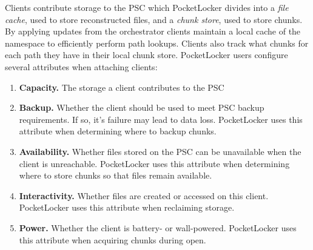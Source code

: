 Clients contribute storage to the PSC which PocketLocker divides into a
\textit{file cache}, used to store reconstructed files, and a \textit{chunk
store}, used to store chunks. By applying updates from the orchestrator
clients maintain a local cache of the namespace to efficiently perform path
lookups. Clients also track what chunks for each path they have in their local
chunk store. PocketLocker users configure several attributes when attaching
clients:

\begin{enumerate}
  
  \item \textbf{Capacity.} The storage a client contributes to the PSC
   
  \item \textbf{Backup.} Whether the client should be used to meet PSC backup
    requirements. If so, it's failure may lead to data loss. PocketLocker
    uses this attribute when determining where to backup chunks.

  \item \textbf{Availability.} Whether files stored on the PSC can be
    unavailable when the client is unreachable. PocketLocker uses this
    attribute when determining where to store chunks so that files remain
    available.

  \item \textbf{Interactivity.} Whether files are created or accessed on this
    client. PocketLocker uses this attribute when reclaiming storage.

  \item \textbf{Power.} Whether the client is battery- or wall-powered.
    PocketLocker uses this attribute when acquiring chunks during open.

\end{enumerate}

